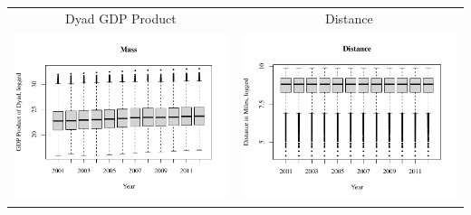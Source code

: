 \documentclass[reqno,onecolumn,letterpaper,12pt]{article}
\begin{document}
\begin{longtable}{c@{\hskip -.8cm}c}
Dyad GDP Product &Distance\\
\includegraphics[height=.17\textheight, clip=true, trim=0cm 1cm 0cm 2cm]{SI_figures/descriptive_plots/Mass_boxplot.pdf}    &
\includegraphics[height=.17\textheight, clip=true, trim=0cm 1cm 0cm 2cm]{SI_figures/descriptive_plots/dist_boxplot.pdf}   \\


\end{longtable}
\end{document}
